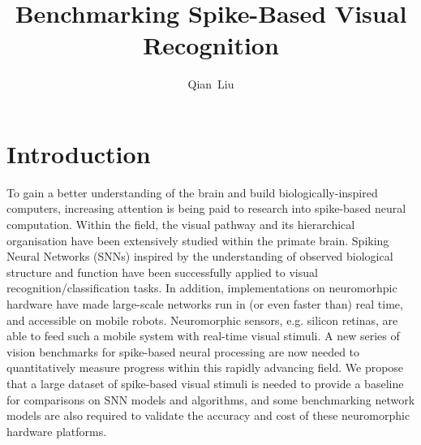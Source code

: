 \documentclass[journal]{journal}
\begin{document}
	\title{Benchmarking Spike-Based Visual Recognition}
	\author{
	Qian~Liu
	}
	\maketitle
	\thispagestyle{empty}

%

\section{Introduction}
	To gain a better understanding of the brain and build biologically-inspired computers, increasing attention is being paid to research into spike-based neural computation.
	Within the field, the visual pathway and its hierarchical organisation have been extensively studied within the primate brain.
	Spiking Neural Networks (SNNs) inspired by the understanding of observed biological structure and function have been successfully applied to visual recognition/classification tasks.
	In addition, implementations on neuromorhpic hardware have made large-scale networks run in (or even faster than) real time, and accessible on mobile robots.
	Neuromorphic sensors, e.g. silicon retinas, are able to feed such a mobile system with real-time visual stimuli.
	A new series of vision benchmarks for spike-based neural processing are now needed to quantitatively measure progress within this rapidly advancing field.
	We propose that a large dataset of spike-based visual stimuli is needed to provide a baseline for comparisons on SNN models and algorithms, and some benchmarking network models are also required to validate the accuracy and cost of these neuromorphic hardware platforms.
	
\end{document}
